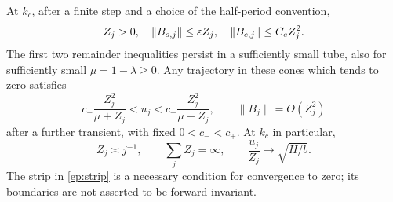 \begin{lemma}
\label{ep:state-strip}
At $k_c$, after a finite step and a choice of the
half-period convention,
\[
 Z_j>0,\quad \|B_{o,j}\|\le\varepsilon Z_j,\quad
 \|B_{e,j}\|\le C_eZ_j^2 .
\]
The first two remainder inequalities persist in a sufficiently
small tube, also for sufficiently small
$\mu=1-\lambda\ge0$.  Any trajectory in these cones
which tends to zero satisfies
\begin{equation}\label{ep:strip}
 c_-\frac{Z_j^2}{\mu+Z_j}
     <u_j<
 c_+\frac{Z_j^2}{\mu+Z_j},
 \qquad \|B_j\|=O(Z_j^2)
\end{equation}
after a further transient, with fixed $0<c_-<c_+$.
At $k_c$ in particular,
\begin{equation}\label{ep:critical-state-asymptotics}
 Z_j\asymp j^{-1},\qquad
 \sum_jZ_j=\infty,\qquad
 \frac{u_j}{Z_j}\longrightarrow\sqrt{H/b}.
\end{equation}
The strip in \eqref{ep:strip} is a necessary condition
for convergence to zero; its boundaries are not asserted
to be forward invariant.
\end{lemma}


